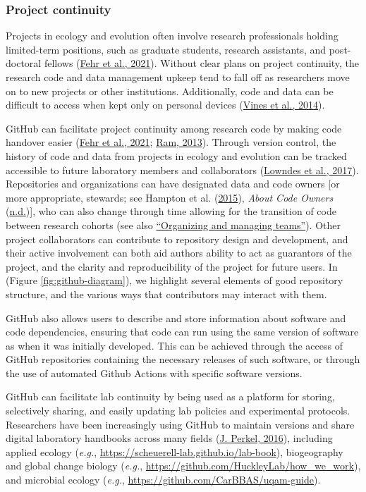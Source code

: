 \hypertarget{project-continuity}{%
\subsubsection{Project continuity}\label{project-continuity}}

Projects in ecology and evolution often involve research professionals holding limited-term positions, such as graduate students, research assistants, and post-doctoral fellows (\protect\hyperlink{ref-D4C4k4ak}{Fehr et al., 2021}).
Without clear plans on project continuity, the research code and data management upkeep tend to fall off as researchers move on to new projects or other institutions.
Additionally, code and data can be difficult to access when kept only on personal devices (\protect\hyperlink{ref-19kmNxiHc}{Vines et al., 2014}).

GitHub can facilitate project continuity among research code by making code handover easier (\protect\hyperlink{ref-D4C4k4ak}{Fehr et al., 2021}; \protect\hyperlink{ref-4ny1onB0}{Ram, 2013}).
Through version control, the history of code and data from projects in ecology and evolution can be tracked accessible to future laboratory members and collaborators (\protect\hyperlink{ref-3DKwn1sY}{Lowndes et al., 2017}).
Repositories and organizations can have designated data and code owners {[}or more appropriate, stewards; see Hampton et al. (\protect\hyperlink{ref-iIEKCTLU}{2015}), \emph{About Code Owners} (\protect\hyperlink{ref-s91uGRZ2}{n.d.}){]}, who can also change through time allowing for the transition of code between research cohorts (see also \protect\hyperlink{organizations}{``Organizing and managing teams''}).
Other project collaborators can contribute to repository design and development, and their active involvement can both aid authors ability to act as guarantors of the project, and the clarity and reproducibility of the project for future users.
In (Figure \ref{fig:github-diagram}), we highlight several elements of good repository structure, and the various ways that contributors may interact with them.

GitHub also allows users to describe and store information about software and code dependencies, ensuring that code can run using the same version of software as when it was initially developed.
This can be achieved through the access of GitHub repositories containing the necessary releases of such software, or through the use of automated Github Actions with specific software versions.

GitHub can facilitate lab continuity by being used as a platform for storing, selectively sharing, and easily updating lab policies and experimental protocols.
Researchers have been increasingly using GitHub to maintain versions and share digital laboratory handbooks across many fields (\protect\hyperlink{ref-10ghgV3S8}{J. Perkel, 2016}), including applied ecology (\emph{e.g.}, \url{https://scheuerell-lab.github.io/lab-book}), biogeography and global change biology (\emph{e.g.}, \url{https://github.com/HuckleyLab/how_we_work}), and microbial ecology (\emph{e.g.}, \url{https://github.com/CarBBAS/uqam-guide}).

